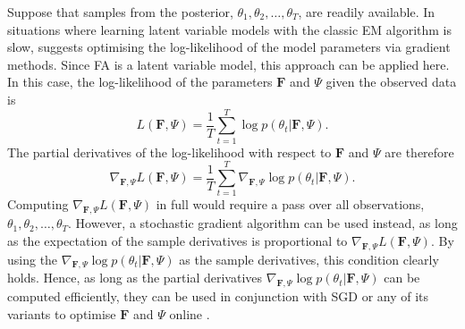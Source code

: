 \documentclass[msc,deptreport.inf]{infthesis} %
\newcommand{\matr}[1]{\mathbf{#1}}
\begin{document}
Suppose that samples from the posterior, $\theta_1, \theta_2, \dots,\theta_T$, are readily available. In situations where learning latent variable models with the classic EM algorithm is slow, \cite{barber2007} suggests optimising the log-likelihood of the model parameters via gradient methods. Since FA is a latent variable model, this approach can be applied here. In this case, the log-likelihood of the parameters $\matr{F}$ and $\Psi$ given the observed data is 
\begin{equation}
	L(\matr{F}, \Psi) = \frac{1}{T} \sum_{t=1}^T \log p(\theta_t | \matr{F}, \Psi).
\end{equation}
The partial derivatives of the log-likelihood with respect to $\matr{F}$ and $\Psi$ are therefore
\begin{equation}
	\nabla_{\matr{F}, \Psi} L(\matr{F}, \Psi) = \frac{1}{T} \sum_{t=1}^T \nabla_{\matr{F}, \Psi} \log p(\theta_t | \matr{F}, \Psi).
\end{equation}
Computing $\nabla_{\matr{F}, \Psi} L(\matr{F}, \Psi)$ in full would require a pass over all observations, $\theta_1, \theta_2, \dots, \theta_T$. However, a stochastic gradient algorithm can be used instead, as long as the expectation of the sample derivatives is proportional to $\nabla_{\matr{F}, \Psi} L(\matr{F}, \Psi)$. By using the $\nabla_{\matr{F}, \Psi} \log p(\theta_t | \matr{F}, \Psi)$ as the sample derivatives, this condition clearly holds. Hence, as long as the partial derivatives $\nabla_{\matr{F}, \Psi} \log p(\theta_t | \matr{F}, \Psi)$ can be computed efficiently, they can be used in conjunction with SGD or any of its variants to optimise $\matr{F}$ and $\Psi$ online \cite{brownlie2021}. 
\end{document}
